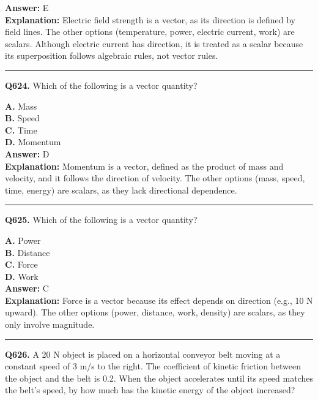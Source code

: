 \documentclass[12pt]{article}
\begin{document}
\textbf{Answer:} E \\
\textbf{Explanation:} Electric field strength is a vector, as its direction is defined by field lines. The other options (temperature, power, electric current, work) are scalars. Although electric current has direction, it is treated as a scalar because its superposition follows algebraic rules, not vector rules.

\hrule
\vspace{1em}


\noindent
\textbf{Q624.} Which of the following is a vector quantity?



\textbf{A.} Mass \\
\textbf{B.} Speed \\
\textbf{C.} Time \\
\textbf{D.} Momentum \\

\textbf{Answer:} D \\
\textbf{Explanation:} Momentum is a vector, defined as the product of mass and velocity, and it follows the direction of velocity. The other options (mass, speed, time, energy) are scalars, as they lack directional dependence.

\hrule
\vspace{1em}


\noindent
\textbf{Q625.} Which of the following is a vector quantity?



\textbf{A.} Power \\
\textbf{B.} Distance \\
\textbf{C.} Force \\
\textbf{D.} Work \\

\textbf{Answer:} C \\
\textbf{Explanation:} Force is a vector because its effect depends on direction (e.g., 10 N upward). The other options (power, distance, work, density) are scalars, as they only involve magnitude.

\hrule
\vspace{1em}


\noindent
\textbf{Q626.} A 20 N object is placed on a horizontal conveyor belt moving at a constant speed of 3 m/s to the right. The coefficient of kinetic friction between the object and the belt is 0.2. When the object accelerates until its speed matches the belt's speed, by how much has the kinetic energy of the object increased?
\end{document}
